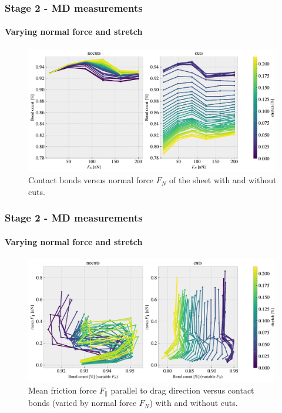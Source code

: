 \documentclass[
	10pt, %
]{beamer}
\begin{document}
\begin{frame}
	\frametitle{Stage 2 - MD measurements}
	\framesubtitle{Varying normal force and stretch}
	\begin{figure}
		\includegraphics[width=\linewidth]{figures/multi4.pdf}
		\caption{Contact bonds versus normal force $F_N$ of the sheet with and without cuts.}
	\end{figure}	
\end{frame}

\begin{frame}
	\frametitle{Stage 2 - MD measurements}
	\framesubtitle{Varying normal force and stretch}
	\begin{figure}
		\includegraphics[width=\linewidth]{figures/multi5.pdf}
		\caption{Mean friction force $F_{\parallel}$ parallel to drag direction versus contact bonds (varied by normal force $F_N$) with and without cuts.}
	\end{figure}	
\end{frame}
\end{document}
